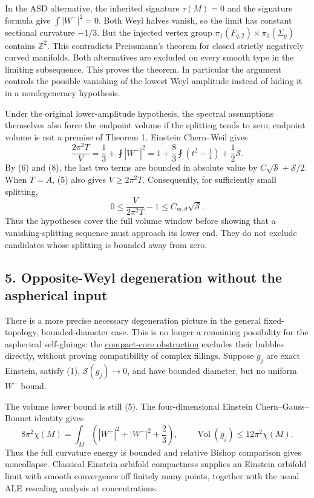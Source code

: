 \documentclass[
  11pt,
]{article}
\begin{document}
In the ASD alternative, the inherited signature \(\tau(M)=0\) and the
signature formula give \(\int|W^-|^2=0\). Both Weyl halves vanish, so
the limit has constant sectional curvature \(-1/3\). But the injected
vertex group \(\pi_1(F_{q,2})\times\pi_1(\Sigma_g)\) contains
\(\mathbb Z^2\). This contradicts Preissmann's theorem for closed
strictly negatively curved manifolds. Both alternatives are excluded on
every smooth type in the limiting subsequence. This proves the theorem.
In particular the argument controls the possible vanishing of the lowest
Weyl amplitude instead of hiding it in a nondegeneracy hypothesis.

Under the original lower-amplitude hypothesis, the spectral assumptions
themselves also force the endpoint volume if the splitting tends to
zero; endpoint volume is not a premise of Theorem 1. Einstein
Chern--Weil gives \[
 \frac{2\pi^2T}{V}=\frac13+\fint|W^+|^2
     =1+\frac83\fint(t^2-\tfrac14)+\frac12\mathscr S.
                                                               \tag{10}
\] By (6) and (8), the last two terms are bounded in absolute value by
\(C\sqrt{\mathscr S}+\mathscr S/2\). When \(T=A\), (5) also gives
\(V\ge2\pi^2T\). Consequently, for sufficiently small splitting, \[
 0\le\frac{V}{2\pi^2T}-1\le C_{m,\theta}\sqrt{\mathscr S}.
                                                               \tag{11}
\] Thus the hypotheses cover the full volume window before showing that
a vanishing-splitting sequence must approach its lower end. They do not
exclude candidates whose splitting is bounded away from zero.

\hypertarget{opposite-weyl-degeneration-without-the-aspherical-input}{%
\subsection{5. Opposite-Weyl degeneration without the aspherical
input}\label{opposite-weyl-degeneration-without-the-aspherical-input}}

There is a more precise necessary degeneration picture in the general
fixed-topology, bounded-diameter case. This is no longer a remaining
possibility for the aspherical self-gluings: the
\href{line1_aspherical_no_bubbles.md}{compact-core obstruction} excludes
their bubbles directly, without proving compatibility of complex
fillings. Suppose \(g_j\) are exact Einstein, satisfy (1),
\(\mathscr S(g_j)\to0\), and have bounded diameter, but no uniform
\(W^-\) bound.

The volume lower bound is still (5). The four-dimensional Einstein
Chern--Gauss--Bonnet identity gives \[
 8\pi^2\chi(M)=\int_M\left(|W^+|^2+|W^-|^2+\frac23\right),
 \qquad \operatorname{Vol}(g_j)\le12\pi^2\chi(M).           \tag{9}
\] Thus the full curvature energy is bounded and relative Bishop
comparison gives noncollapse. Classical Einstein orbifold compactness
supplies an Einstein orbifold limit with smooth convergence off finitely
many points, together with the usual ALE rescaling analysis at
concentrations.
\end{document}
